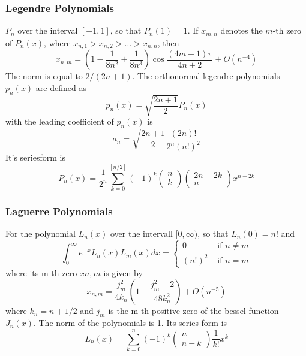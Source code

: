 \documentclass[%
reprint,
amsmath,amssymb,
aps,
]{revtex4-1}
\begin{document}
\newpage
\twocolumngrid

\subsubsection{Legendre Polynomials}
$P_n$ over the interval $[-1,1]$, so that $P_n(1) = 1$. If $x_{m,n}$ denotes the $m$-th zero of $P_n(x)$, where $x_{n,1} > x_{n,2} > \dots > x_{n,n} $, then 
\begin{equation}
x_{n, m}=\left(1-\frac{1}{8 n^{2}}+\frac{1}{8 n^{3}}\right) \cos \frac{(4 m-1) \pi}{4 n+2}+O\left(n^{-4}\right)
\end{equation}
The norm is equal to $2/(2n+1)$. The orthonormal legendre polynomials $p_n(x)$ are defined as 
\begin{equation}
p_{n}(x)=\sqrt{\frac{2 n+1}{2}} P_{n}(x)
\end{equation}
with the leading coefficient of $p_n(x)$ is 
\begin{equation}
a_{n}=\sqrt{\frac{2 n+1}{2}} \frac{(2 n) !}{2^{n}(n !)^{2}}
\end{equation}
It's seriesform is
\begin{equation}
P_{n}(x)=\frac{1}{2^{n}} \sum_{k=0}^{[n / 2]}(-1)^{k}\left(\begin{array}{l}{n} \\ {k}\end{array}\right)\left(\begin{array}{c}{2 n-2 k} \\ {n}\end{array}\right) x^{n-2 k}
\end{equation}
\subsubsection{Laguerre Polynomials}
For the polynomial $L_n(x)$ over the intervall $[0,\infty)$, so that $L_n(0) = n!$ and
\begin{equation}
\int_{0}^{\infty} e^{-x} L_{n}(x) L_{m}(x) d x=\left\{\begin{array}{ll}{0} & {\text { if } n \neq m} \\ {(n !)^{2}} & {\text { if } n=m}\end{array}\right.
\end{equation}
where its m-th zero $xn,m$ is given by 
\begin{equation}
x_{n, m}=\frac{j_{m}^{2}}{4 k_{n}}\left(1+\frac{j_{m}^{2}-2}{48 k_{n}^{2}}\right)+O\left(n^{-5}\right)
\end{equation}
where $k_n = n + 1/2$ and $j_m$ is the m-th positive zero of the bessel function $J_n(x)$. The norm of the polynomials is 1. 
Its series form is
\begin{equation}
L_{n}(x)=\sum_{k=0}^{n}(-1)^{k}\left(\begin{array}{c}{n} \\ {n-k}\end{array}\right) \frac{1}{k !} x^{k}
\end{equation}
\end{document}
